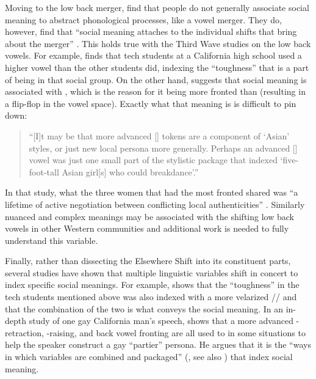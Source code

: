 Moving to the low back merger, \citet{eckert_labov_2017} find that people do not generally associate social meaning to abstract phonological processes, like a vowel merger. They do, however, find that ``social meaning attaches to the individual shifts that bring about the merger'' \citeyearpar[484]{eckert_labov_2017}. This holds true with the Third Wave studies on the low back vowels. For example, \citep{pratt_2018} finds that tech students at a California high school used a higher \lot vowel than the other students did, indexing the ``toughness'' that is a part of being in that social group. On the other hand, \citet{hall_lew_2013} suggests that social meaning is associated with \thought, which is the reason for it being more fronted than \lot (resulting in a flip-flop in the vowel space). Exactly what that meaning is is difficult to pin down:
\begin{quote}
    ``[I]t may be that more advanced [{\thought}] tokens are a component of `Asian' styles, or just new local persona more generally. Perhaps an advanced [{\thought}] vowel was just one small part of the stylistic package that indexed `five-foot-tall Asian girl[s] who could breakdance'.'' \citet[381]{hall_lew_2013}
\end{quote}
In that study, what the three women that had the most fronted \thought shared was ``a lifetime of active negotiation between conflicting local authenticities'' \citeyearpar[386]{hall_lew_2013}. Similarly nuanced and complex meanings may be associated with the shifting low back vowels in other Western communities and additional work is needed to fully understand this variable.

Finally, rather than dissecting the Elsewhere Shift into its constituent parts, several studies have shown that multiple linguistic variables shift in concert to index specific social meanings. For example, \citet{pratt_2018} shows that the ``toughness'' in the tech students mentioned above was also indexed with a more velarized // and that the combination of the two is what conveys the social meaning. In an in-depth study of one gay California man's speech, \citet{podesva_2011} shows that a more advanced \bat-retraction, \ban-raising, and back vowel fronting are all used to in some situations to help the speaker construct a gay ``partier'' persona. He argues that it is the ``ways in which variables are combined and packaged'' (\citealt[41]{podesva_2011}, see also \citealt{campbellkibler_2011}) that index social meaning.


